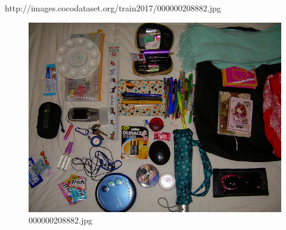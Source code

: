 http://images.cocodataset.org/train2017/000000208882.jpg
\begin{figure}[h]
    \centering
    \includegraphics[width=0.8\linewidth]{../image set/hard/000000208882.jpg}
    \caption{000000208882.jpg}
\end{figure}
